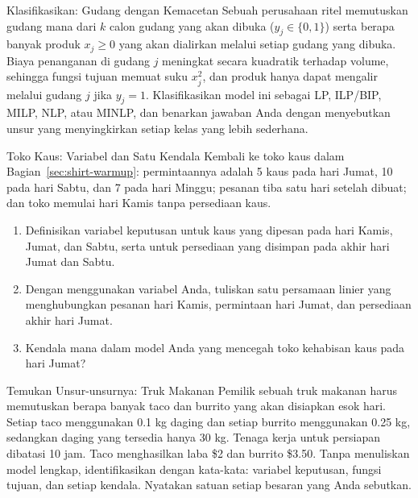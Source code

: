 \begin{ex}{Klasifikasikan: Gudang dengan Kemacetan}{}
 Sebuah perusahaan ritel memutuskan gudang mana dari $k$ calon gudang yang akan dibuka ($y_j \in \{0,1\}$) serta berapa banyak produk $x_j \geq 0$ yang akan dialirkan melalui setiap gudang yang dibuka. Biaya penanganan di gudang $j$ meningkat secara kuadratik terhadap volume, sehingga fungsi tujuan memuat suku $x_j^2$, dan produk hanya dapat mengalir melalui gudang $j$ jika $y_j = 1$. Klasifikasikan model ini sebagai LP, ILP/BIP, MILP, NLP, atau MINLP, dan benarkan jawaban Anda dengan menyebutkan unsur yang menyingkirkan setiap kelas yang lebih sederhana.
\end{ex}


\begin{ex}{Toko Kaus: Variabel dan Satu Kendala}{}
\label{ex:shirt-friday-balance}
 Kembali ke toko kaus dalam Bagian~\ref{sec:shirt-warmup}: permintaannya adalah 5 kaus pada hari Jumat, 10 pada hari Sabtu, dan 7 pada hari Minggu; pesanan tiba satu hari setelah dibuat; dan toko memulai hari Kamis tanpa persediaan kaus.
\begin{enumerate}
\item Definisikan variabel keputusan untuk kaus yang dipesan pada hari Kamis, Jumat, dan Sabtu, serta untuk persediaan yang disimpan pada akhir hari Jumat dan Sabtu.
\item Dengan menggunakan variabel Anda, tuliskan satu persamaan linier yang menghubungkan pesanan hari Kamis, permintaan hari Jumat, dan persediaan akhir hari Jumat.
\item Kendala mana dalam model Anda yang mencegah toko kehabisan kaus pada hari Jumat?
\end{enumerate}
\end{ex}

\begin{ex}{Temukan Unsur-unsurnya: Truk Makanan}{}
 Pemilik sebuah truk makanan harus memutuskan berapa banyak taco dan burrito yang akan disiapkan esok hari. Setiap taco menggunakan 0.1 kg daging dan setiap burrito menggunakan 0.25 kg, sedangkan daging yang tersedia hanya 30 kg. Tenaga kerja untuk persiapan dibatasi 10 jam. Taco menghasilkan laba \$2 dan burrito \$3.50. Tanpa menuliskan model lengkap, identifikasikan dengan kata-kata: variabel keputusan, fungsi tujuan, dan setiap kendala. Nyatakan satuan setiap besaran yang Anda sebutkan.
\end{ex}

